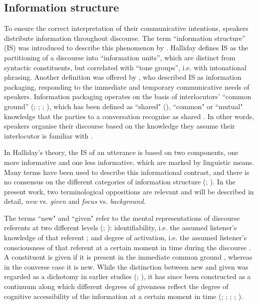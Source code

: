 \subsection{Information structure}
\label{sec:2.1.1}

To ensure the correct interpretation of their communicative intentions, speakers distribute information throughout discourse. The term “information structure” (IS) was introduced to describe this phenomenon by \citet{Halliday1967}. Halliday defines IS as the partitioning of a discourse into “information units”, which are distinct from syntactic constituents, but correlated with “tone groups”, i.e. with intonational phrasing. Another definition was offered by \citet{Chafe1976}, who described IS as information packaging, responding to the immediate and temporary communicative needs of speakers. Information packaging operates on the basis of interlocutors’ “common ground” (\citealt{Chafe1976}; \citealt{Karttunen1974}; \citealt{Krifka2008}; \citealt{Stalnaker1974}), which has been defined as “shared" (\citealt{ClarkHaviland1977}), “common" \citep{Lewis1979} or “mutual" \citep{Schiffer1972} knowledge that the parties to a conversation recognise as shared \citep{Stalnaker2002}. In other words, speakers organise their discourse based on the knowledge they assume their interlocutor is familiar with \citep{Prince1981}.

In Halliday’s theory, the IS of an utterance is based on two components, one more informative and one less informative, which are marked by linguistic means. Many terms have been used to describe this informational contrast, and there is no consensus on the different categories of information structure (\citealt{Büring2007}; \citealt{VonHeusinger1999}). In the present work, two terminological oppositions are relevant and will be described in detail, \textit{new} vs. \textit{given} and \textit{focus} vs. \textit{background}.

The terms “new" and “given" refer to the mental representations of discourse referents at two different levels (\citealt{Chafe1994}; \citealt{Lambrecht1994}): identifiability, i.e. the assumed listener’s knowledge of that referent \citep{Prince1981}; and degree of activation, i.e. the assumed listener’s consciousness of that referent at a certain moment in time during the discourse \citep{Chafe1994}. A constituent is given if it is present in the immediate common ground \citep{Krifka2008}, whereas in the converse case it is new. While the distinction between new and given was regarded as a dichotomy in earlier studies (\citealt{BrazilEtAl1980}; \citealt{Halliday1967}), it has since been constructed as a continuum along which different degrees of givenness reflect the degree of cognitive accessibility of the information at a certain moment in time (\citealt{Baumann2005}; \citealt{BaumannGrice2006}; \citealt{BaumannRiester2012}; \citealt{Chafe1994}; \citealt{Prince1981}).

